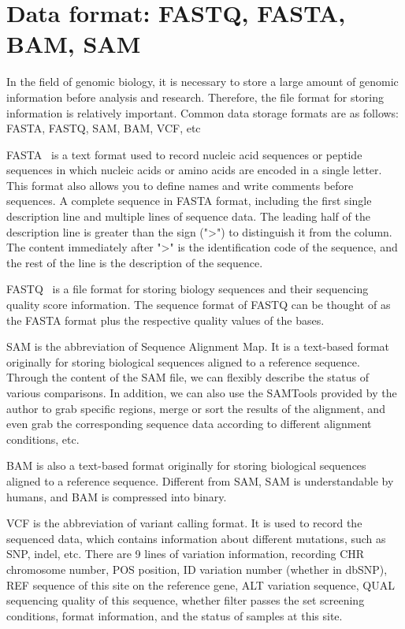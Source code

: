 \documentclass{PHlab-thesis}
\begin{document}
\section{Data format: FASTQ, FASTA, BAM, SAM}
In the field of genomic biology, it is necessary to store a large amount of genomic information before analysis and research. Therefore, the file format for storing information is relatively important. Common data storage formats are as follows: FASTA, FASTQ, SAM, BAM, VCF, etc
\par FASTA~\cite{pearson1988improved} is a text format used to record nucleic acid sequences or peptide sequences in which nucleic acids or amino acids are encoded in a single letter. This format also allows you to define names and write comments before sequences. A complete sequence in FASTA format, including the first single description line and multiple lines of sequence data. The leading half of the description line is greater than the sign (">") to distinguish it from the column. The content immediately after ">" is the identification code of the sequence, and the rest of the line is the description of the sequence.
\par FASTQ~\cite{cock2010sanger} is a file format for storing biology sequences and their sequencing quality score information. The sequence format of FASTQ can be thought of as the FASTA format plus the respective quality values of the bases.
\par SAM is the abbreviation of Sequence Alignment Map. It is a text-based format originally for storing biological sequences aligned to a reference sequence. Through the content of the SAM file, we can flexibly describe the status of various comparisons. In addition, we can also use the SAMTools provided by the author to grab specific regions, merge or sort the results of the alignment, and even grab the corresponding sequence data according to different alignment conditions, etc.
\par BAM is also a text-based format originally for storing biological sequences aligned to a reference sequence. Different from SAM, SAM is understandable by humans, and BAM is compressed into binary.
\par VCF is the abbreviation of variant calling format. It is used to record the sequenced data, which contains information about different mutations, such as SNP, indel, etc. There are 9 lines of variation information, recording CHR chromosome number, POS position, ID variation number (whether in dbSNP), REF sequence of this site on the reference gene, ALT variation sequence, QUAL sequencing quality of this sequence, whether filter passes the set screening conditions, format information, and the status of samples at this site.
\end{document}
